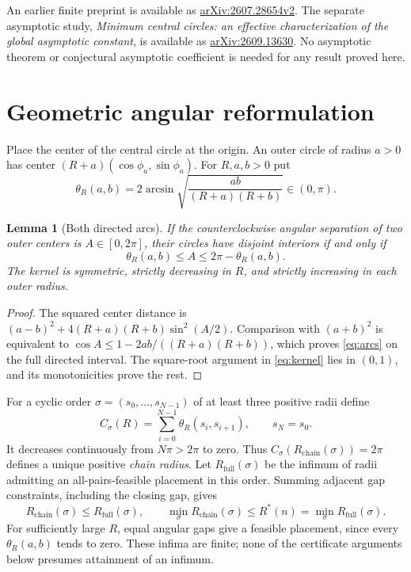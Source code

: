 \documentclass[11pt]{article}
\newtheorem{lemma}[theorem]{Lemma}
\theoremstyle{definition}
\theoremstyle{remark}
\newcommand{\Rchain}{R_{\mathrm{chain}}}
\newcommand{\Rfull}{R_{\mathrm{full}}}
\newcommand{\Rstar}{R^*}
\begin{document}
An earlier finite preprint is available as
\href{https://arxiv.org/abs/2607.28654v2}{arXiv:2607.28654v2}.
The separate asymptotic study,
\emph{Minimum central circles: an effective characterization of the global
asymptotic constant}, is available as
\href{https://arxiv.org/abs/2609.13630}{arXiv:2609.13630}.
No asymptotic theorem or conjectural asymptotic coefficient is needed for
any result proved here.

\section{Geometric angular reformulation}\label{sec:geometry}
Place the center of the central circle at the origin. An outer circle
of radius $a>0$
has center $(R+a)(\cos\phi_a,\sin\phi_a)$. For $R,a,b>0$ put
\begin{equation}\label{eq:kernel}
 \theta_R(a,b)=2\arcsin\sqrt{\frac{ab}{(R+a)(R+b)}}\in(0,\pi).
\end{equation}
\begin{lemma}[Both directed arcs]\label{lem:angular}
If the counterclockwise angular separation of two outer centers is
$A\in[0,2\pi]$, their circles have disjoint interiors if and only if
\begin{equation}\label{eq:arcs}
 \theta_R(a,b)\le A\le2\pi-\theta_R(a,b).
\end{equation}
The kernel is symmetric, strictly decreasing in $R$, and strictly increasing
in each outer radius.
\end{lemma}
\begin{proof}
The squared center distance is
$(a-b)^2+4(R+a)(R+b)\sin^2(A/2)$. Comparison with $(a+b)^2$
is equivalent to $\cos A\le1-2ab/((R+a)(R+b))$, which proves
\eqref{eq:arcs} on the full directed interval. The square-root argument in
\eqref{eq:kernel} lies in $(0,1)$, and its monotonicities prove the rest.
\end{proof}

For a cyclic order $\sigma=(s_0,\ldots,s_{N-1})$ of at least three
positive radii define
\[
 C_\sigma(R)=\sum_{i=0}^{N-1}\theta_R(s_i,s_{i+1}),\qquad s_N=s_0.
\]
It decreases continuously from $N\pi>2\pi$ to zero. Thus
$C_\sigma(\Rchain(\sigma))=2\pi$ defines a unique positive
\emph{chain radius}. Let $\Rfull(\sigma)$ be the infimum of radii
admitting an all-pairs-feasible placement in this order. Summing adjacent
gap constraints, including the closing gap, gives
\begin{equation}\label{eq:hierarchy}
 \Rchain(\sigma)\le\Rfull(\sigma),\qquad
 \min_\sigma\Rchain(\sigma)\le\Rstar(n)=\min_\sigma\Rfull(\sigma).
\end{equation}
For sufficiently large $R$, equal angular gaps give a feasible placement,
since every $\theta_R(a,b)$ tends to zero. These infima are finite; none
of the certificate arguments below presumes attainment of an infimum.
\end{document}
